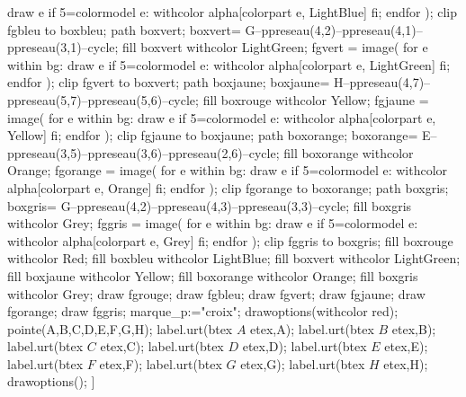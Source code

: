 \begin{corrige}
{                draw e if 5=colormodel e: withcolor alpha[colorpart e, LightBlue] fi;
            endfor
        );
        clip fgbleu to boxbleu;
        path boxvert; boxvert= G--ppreseau(4,2)--ppreseau(4,1)--ppreseau(3,1)--cycle;
        fill boxvert withcolor LightGreen;
        fgvert = image( 
            for e within bg:
                draw e if 5=colormodel e: withcolor alpha[colorpart e, LightGreen] fi;
            endfor
        );
        clip fgvert to boxvert;
        path boxjaune; boxjaune= H--ppreseau(4,7)--ppreseau(5,7)--ppreseau(5,6)--cycle;        
        fill boxrouge withcolor Yellow;
        fgjaune = image( 
        for e within bg:
            draw e if 5=colormodel e: withcolor alpha[colorpart e, Yellow] fi;
        endfor
        );
        clip fgjaune to boxjaune; 
        path boxorange; boxorange= E--ppreseau(3,5)--ppreseau(3,6)--ppreseau(2,6)--cycle;
        fill boxorange withcolor Orange;
        fgorange = image( 
            for e within bg:
                draw e if 5=colormodel e: withcolor alpha[colorpart e, Orange] fi;
            endfor
        );
        clip fgorange to boxorange;
        path boxgris; boxgris= G--ppreseau(4,2)--ppreseau(4,3)--ppreseau(3,3)--cycle;
        fill boxgris withcolor Grey;
        fggris = image( 
            for e within bg:
                draw e if 5=colormodel e: withcolor alpha[colorpart e, Grey] fi;
            endfor
        );
        clip fggris to boxgris;
        fill boxrouge withcolor Red;
        fill boxbleu withcolor LightBlue;
        fill boxvert withcolor LightGreen;
        fill boxjaune withcolor Yellow;
        fill boxorange withcolor Orange;
        fill boxgris withcolor Grey;
        draw fgrouge;
        draw fgbleu;
        draw fgvert;
        draw fgjaune;
        draw fgorange;
        draw fggris;
        marque_p:="croix";
        drawoptions(withcolor red);
        pointe(A,B,C,D,E,F,G,H);
        label.urt(btex $A$ etex,A);
        label.urt(btex $B$ etex,B);
        label.urt(btex $C$ etex,C);
        label.urt(btex $D$ etex,D);
        label.urt(btex $E$ etex,E);
        label.urt(btex $F$ etex,F);
        label.urt(btex $G$ etex,G);
        label.urt(btex $H$ etex,H);
        drawoptions();
    }]{}
\end{corrige}

